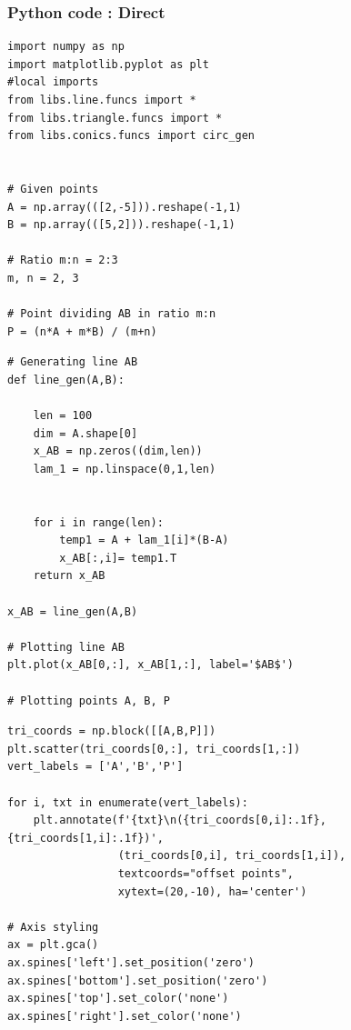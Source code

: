 \documentclass{beamer}
\begin{document}
	\begin{frame}[fragile]
\frametitle{Python code : Direct }

\begin{lstlisting}
import numpy as np
import matplotlib.pyplot as plt
#local imports
from libs.line.funcs import *
from libs.triangle.funcs import *
from libs.conics.funcs import circ_gen


# Given points
A = np.array(([2,-5])).reshape(-1,1)
B = np.array(([5,2])).reshape(-1,1)

# Ratio m:n = 2:3
m, n = 2, 3

# Point dividing AB in ratio m:n
P = (n*A + m*B) / (m+n)
\end{lstlisting}
\end{frame}

\begin{frame}[fragile]

\begin{lstlisting}
# Generating line AB
def line_gen(A,B):

    len = 100
    dim = A.shape[0]
    x_AB = np.zeros((dim,len))
    lam_1 = np.linspace(0,1,len)
    
    
    for i in range(len):
        temp1 = A + lam_1[i]*(B-A)
        x_AB[:,i]= temp1.T
    return x_AB

x_AB = line_gen(A,B)

# Plotting line AB
plt.plot(x_AB[0,:], x_AB[1,:], label='$AB$')

# Plotting points A, B, P
\end{lstlisting}
\end{frame}

\begin{frame}[fragile]

\begin{lstlisting}
tri_coords = np.block([[A,B,P]])
plt.scatter(tri_coords[0,:], tri_coords[1,:])
vert_labels = ['A','B','P']

for i, txt in enumerate(vert_labels):
    plt.annotate(f'{txt}\n({tri_coords[0,i]:.1f}, {tri_coords[1,i]:.1f})',
                 (tri_coords[0,i], tri_coords[1,i]),
                 textcoords="offset points",
                 xytext=(20,-10), ha='center')

# Axis styling
ax = plt.gca()
ax.spines['left'].set_position('zero')
ax.spines['bottom'].set_position('zero')
ax.spines['top'].set_color('none')
ax.spines['right'].set_color('none')
\end{lstlisting}
\end{frame}
\end{document}

